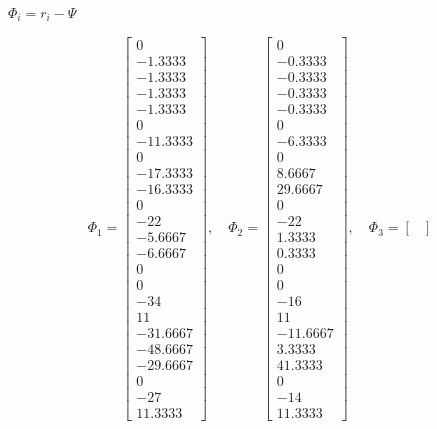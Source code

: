 $\Phi_i = r_i - \Psi$

\[
\Phi_1 = \begin{bmatrix}
0 \\
-1.3333 \\
-1.3333 \\
-1.3333 \\
-1.3333 \\
0 \\
-11.3333 \\
0 \\
-17.3333 \\
-16.3333 \\
0 \\
-22 \\
-5.6667 \\
-6.6667 \\
0 \\
0 \\
-34 \\
11 \\
-31.6667 \\
-48.6667 \\
-29.6667 \\
0 \\
-27 \\
11.3333
\end{bmatrix}, \quad
\Phi_2 = \begin{bmatrix}
0 \\
-0.3333 \\
-0.3333 \\
-0.3333 \\
-0.3333 \\
0 \\
-6.3333 \\
0 \\
8.6667 \\
29.6667 \\
0 \\
-22 \\
1.3333 \\
0.3333 \\
0 \\
0 \\
-16 \\
11 \\
-11.6667 \\
3.3333 \\
41.3333 \\
0 \\
-14 \\
11.3333
\end{bmatrix}, \quad
\Phi_3 = \begin{bmatrix}

\end{bmatrix}\]
